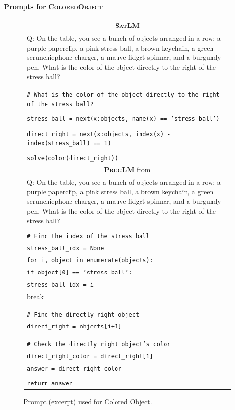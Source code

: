 \documentclass{article}
\theoremstyle{definition}
\newcommand{\satlm}{\textsc{SatLM}}
\newcommand{\pallm}{\textsc{ProgLM}}
\begin{document}
\newpage
\textbf{Prompts for \textsc{ColoredObject}}
\begin{figure}[h]
    \footnotesize
    \centering
    \begin{tabularx}{\linewidth}{X}
    \toprule
            \multicolumn{1}{c}{\textbf{\satlm{}} } \\
            \midrule
            Q: On the table, you see a bunch of objects arranged in a row: a purple paperclip, a pink stress ball, a brown keychain, a green scrunchiephone charger, a mauve fidget spinner, and a burgundy pen. What is the color of the object directly to the right of the stress ball? \\
\\
\\
\tt \# What is the color of the object directly to the right of the stress ball? \\
\\
\tt stress\_ball = next(x:objects, name(x) == 'stress ball') \\
\\
\tt direct\_right = next(x:objects, index(x) - index(stress\_ball) == 1) \\
\\
\tt solve(color(direct\_right)) \\
         \midrule
\multicolumn{1}{c}{\textbf{\pallm{}} from \cite{pal} } \\
\midrule
Q: On the table, you see a bunch of objects arranged in a row: a purple paperclip, a pink stress ball, a brown keychain, a green scrunchiephone charger, a mauve fidget spinner, and a burgundy pen. What is the color of the object directly to the right of the stress ball? \\
\\
                     
\tt \# Find the index of the stress ball \\
\tt stress\_ball\_idx = None \\
\tt for i, object in enumerate(objects): \\
\tt   \quad  if object[0] == 'stress ball': \\
  \tt \quad \quad stress\_ball\_idx = i \\
        \quad \quad break \\
\\
\\
\tt \# Find the directly right object \\ 
\tt direct\_right = objects[i+1] \\
\\
\\
\tt \# Check the directly right object's color \\
\tt direct\_right\_color = direct\_right[1] \\
\tt answer = direct\_right\_color\\
\\
\tt return answer \\
         \bottomrule
    \end{tabularx}
    \caption{Prompt (excerpt) used for {\sc Colored Object}. }
\end{figure}
\end{document}
